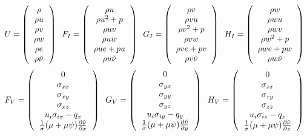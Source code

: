 \begin{equation}
U = \l(
\begin{tabular}{c}
$\rho$\\
$\rho u$\\
$\rho v$\\
$\rho w$\\
$\rho e$ \\
$\rho\tilde\nu$
\end{tabular}
\r) \;\; 
F_I = \l(
\begin{tabular}{c}
$\rho u$\\
$\rho u^2 + p$\\
$\rho uv$\\
$\rho uw$\\
$\rho ue + pu$\\
$\rho u\tilde\nu$
\end{tabular}
\r) \;\; 
G_I = \l(
\begin{tabular}{c}
$\rho v$\\
$\rho vu$\\
$\rho v^2 + p$\\
$\rho vw$\\
$\rho ve+pv$\\
$\rho v\tilde\nu$
\end{tabular}
\r) \;\; 
H_I = \l(
\begin{tabular}{c}
$\rho w$\\
$\rho wu$\\
$\rho wv$\\
$\rho w^2 + p$\\
$\rho we + pw$\\
$\rho w\tilde\nu$
\end{tabular}
\r) \;\; 
\end{equation}
\begin{equation}
F_V = \l(
\begin{tabular}{c}
$0$\\
$\sigma_{xx}$\\
$\sigma_{xy}$\\
$\sigma_{xz}$\\
$u_i\sigma_{ix}-q_x$\\
$\frac{1}{\sigma}(\mu + \mu \psi)\frac{\partial \tilde \nu}{\partial x}$
\end{tabular}
\r) \;\; 
G_V = \l(
\begin{tabular}{c}
$0$\\
$\sigma_{yx}$\\
$\sigma_{yy}$\\
$\sigma_{yz}$\\
$u_i\sigma_{iy}-q_y$\\
$\frac{1}{\sigma}(\mu + \mu \psi)\frac{\partial \tilde \nu}{\partial y}$
\end{tabular}
\r) \;\; 
H_V = \l(
\begin{tabular}{c}
$0$\\
$\sigma_{zx}$\\
$\sigma_{zy}$\\
$\sigma_{zz}$\\
$u_i\sigma_{iz}-q_z$\\
$\frac{1}{\sigma}(\mu + \mu \psi)\frac{\partial \tilde \nu}{\partial z}$
\end{tabular}
\r) \;\; 
\end{equation}
